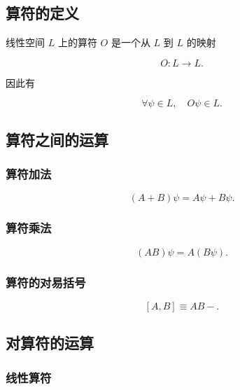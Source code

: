 \subsection{算符的定义}

线性空间 $L $ 上的算符 $O $ 是一个从 $L $ 到 $L $ 的映射

\begin{equation}
O : L \to L.
\end{equation}

因此有

\begin{equation}
\forall \psi \in L,\quad
O \psi \in L.
\end{equation}

\subsection{算符之间的运算}

\subsubsection{算符加法}

\begin{equation}
(A+B) \psi = A \psi + B \psi.
\end{equation}

\subsubsection{算符乘法}

\begin{equation}
(AB) \psi = A(B \psi).
\end{equation}

\subsubsection{算符的对易括号}

\begin{equation}
\left[A , B \right]
\equiv AB - .
\end{equation}

\subsection{对算符的运算}

\subsubsection{线性算符}

